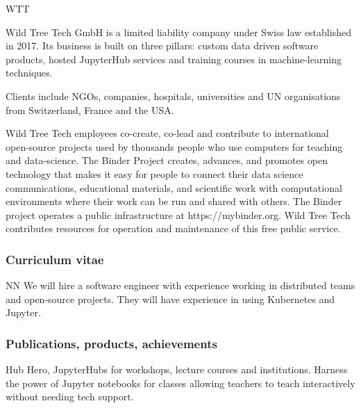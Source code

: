 \begin{sitedescription}{WTT}
\label{sitedescription:wildtree}

Wild Tree Tech GmbH is a limited liability company under Swiss law established
in 2017. Its business is built on three pillars: custom data driven software products,
hosted JupyterHub services and training courses in machine-learning techniques.

Clients include NGOs, companies, hospitals, universities and UN organisations
from Switzerland, France and the USA.

Wild Tree Tech employees co-create, co-lead and contribute to international
open-source projects used by thousands people who use computers for teaching
and data-science. The Binder Project creates, advances, and promotes
open technology that makes it easy for people to connect their data
science communications, educational materials, and scientific work with
computational environments where their work can be run and shared with others.
The Binder project operates a public infrastructure at https://mybinder.org.
Wild Tree Tech contributes resources for operation and maintenance of this
free public service.



\subsubsection*{Curriculum vitae}




\begin{participant}[type=res,PM=24,salary=9580]{NN} %
  We will hire a software engineer with experience working in distributed teams
  and open-source projects. They will have experience in using Kubernetes and
  Jupyter.
\end{participant}

\subsubsection*{Publications, products, achievements}

\begin{compactenum}
\item Hub Hero, JupyterHubs for workshops, lecture courses and institutions. Harness the power of Jupyter notebooks for classes allowing teachers to teach interactively without needing tech support.
\end{compactenum}


\end{sitedescription}
